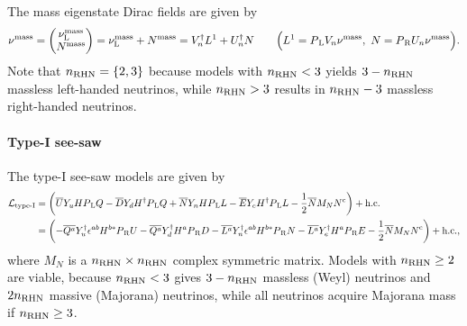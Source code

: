 \documentclass[CheatSheet]{subfiles}
\begin{document}
The mass eigenstate Dirac fields are given by
\begin{equation}
 \nu^{\text{mass}} = \begin{pmatrix}\nu_{\mathrm{L}}^{\text{mass}}\\N^{\text{mass}}\end{pmatrix} = 
\nu_{\mathrm{L}}^{\text{mass}}+N^{\text{mass}}=
V_n^\dagger L^1 + U_n^\dagger N
\qquad
 \Bigl(L^1 = P_{\,\mathrm L} V_n \nu^{\text{mass}},~
 N = P_{\,\mathrm R} U_n \nu^{\text{mass}}\Bigr).
\end{equation}
Note that $n\w{RHN}=\{2,3\}$ because models with $n\w{RHN}<3$ yields $3-n\w{RHN}$ massless left-handed neutrinos, while $n\w{RHN}>3$ results in $n\w{RHN}-3$ massless right-handed neutrinos.

\paragraph{Type-I see-saw}
The type-I see-saw models are given by 
\begin{align}
   \mathcal L_{\text{type-I}}&=
\left(  \overline{U}Y_{u} H P_{\,\mathrm L} Q
- \overline{D}Y_{d} H^\dagger P_{\,\mathrm L} Q
+ \overline{N}Y_{n} H P_{\,\mathrm L} L
- \overline{E}Y_{e} H^\dagger P_{\,\mathrm L} L
- \frac{1}{2}\overline{N}M_N  N^{\mathrm{c}}
\right)+ \text{h.c.}
\\&=
\left(- \overline{Q^a}Y_{u}^\dagger \epsilon^{ab}H^{b*} P_{\,\mathrm R} U
- \overline{Q^a}Y_{d}^\dagger H^{a} P_{\,\mathrm R} D
- \overline{L^a}Y_{n}^\dagger \epsilon^{ab}H^{b*} P_{\,\mathrm R} N
- \overline{L^a}Y_{e}^\dagger H^{a} P_{\,\mathrm R} E
- \frac{1}{2}\overline{N}M_N  N^{\mathrm{c}}\right) + \text{h.c.},
\label{eq:type-1-lagrangian}
\end{align}
where $M_N$ is a $n\w{RHN}\times n\w{RHN}$ complex symmetric matrix.
Models with $n\w{RHN}\ge2$ are viable, because $n\w{RHN}<3$ gives $3-n\w{RHN}$ massless (Weyl) neutrinos and $2n\w{RHN}$ massive (Majorana) neutrinos, while all neutrinos acquire Majorana mass  if $n\w{RHN}\ge 3$.
\end{document}
